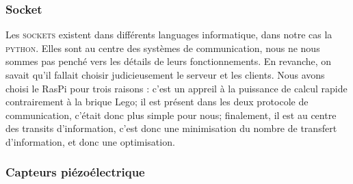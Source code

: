 \documentclass[twoside,twocolumn, 16pt]{article}
\begin{document}
\subsubsection{Socket}
Les \textsc{sockets} existent dans différents languages informatique, dans notre cas la \textsc{python}. Elles sont au centre des systèmes de communication, nous ne nous sommes pas penché vers les détails de leurs fonctionnements. En revanche, on savait qu'il fallait choisir judicieusement le serveur et les clients. Nous avons choisi le RasPi pour trois raisons : c'est un appreil à la puissance de calcul rapide contrairement à la brique Lego; il est présent dans les deux protocole de communication, c'était donc plus simple pour nous; finalement, il est au centre des transits d'information, c'est donc une minimisation du nombre de transfert d'information, et donc une optimisation. 

\subsubsection{Capteurs piézoélectrique}
\end{document}

